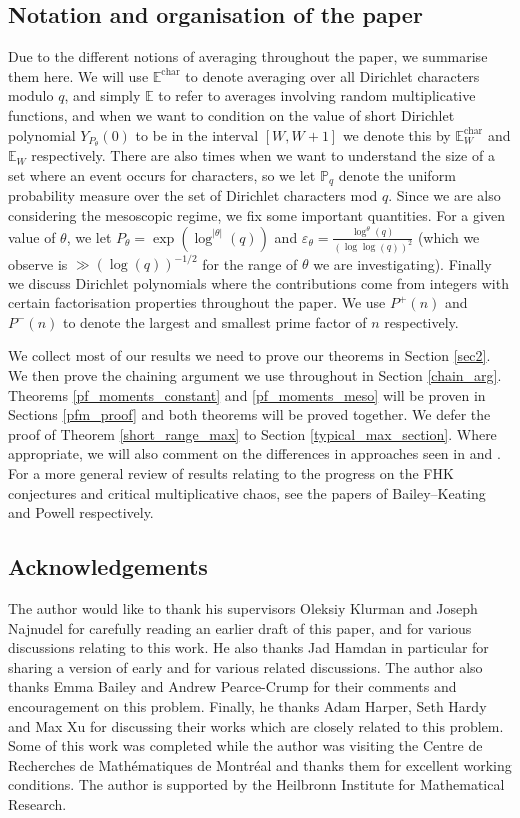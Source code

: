 \documentclass[reqno]{amsart}
\theoremstyle{definition}
\theoremstyle{remark}
\numberwithin{equation}{section}
\theoremstyle{remark}
\begin{document}
\subsection{Notation and organisation of the paper}
Due to the different notions of averaging throughout the paper, we summarise them here. We will use $\mathbb{E}^{\text{char}}$ to denote averaging over all Dirichlet characters modulo $q$, and simply $\mathbb{E}$ to refer to averages involving random multiplicative functions, and when we want to condition on the value of short Dirichlet polynomial $Y_{P_\theta}(0)$ to be in the interval $[W,W+1]$ we denote this by $\mathbb{E}_{W}^{\text{char}}$ and $\mathbb{E}_W$ respectively. There are also times when we want to understand the size of a set where an event occurs for characters, so we let $\mathbb{P}_q$ denote the uniform probability measure over the set of Dirichlet characters mod $q$. Since we are also considering the mesoscopic regime, we fix some important quantities. For a given value of $\theta$, we let $P_\theta = \exp(\log^{|\theta|}(q))$ and $\varepsilon_\theta = \frac{\log^\theta(q)}{(\log\log(q))^2}$ (which we observe is $\gg (\log(q))^{-1/2}$ for the range of $\theta$ we are investigating). Finally we discuss Dirichlet polynomials where the contributions come from integers with certain factorisation properties throughout the paper. We use $P^+(n)$ and $P^{-}(n)$ to denote the largest and smallest prime factor of $n$ respectively.\par
We collect most of our results we need to prove our theorems in Section \ref{sec2}. We then prove the chaining argument we use throughout in Section \ref{chain_arg}. Theorems \ref{pf_moments_constant} and \ref{pf_moments_meso} will be proven in Sections \ref{pfm_proof} and both theorems will be proved together. We defer the proof of Theorem \ref{short_range_max} to Section \ref{typical_max_section}. Where appropriate, we will also comment on the differences in approaches seen in \cite{harper2019partition} and \cite{abr20}. For a more general review of results relating to the progress on the FHK conjectures and critical multiplicative chaos, see the papers of Bailey--Keating \cite{bk22} and Powell \cite{powell22} respectively.
\subsection*{Acknowledgements}
The author would like to thank his supervisors Oleksiy Klurman and Joseph Najnudel for carefully reading an earlier draft of this paper, and for various discussions relating to this work. He also thanks Jad Hamdan in particular for sharing a version of \cite{ah24} early and for various related discussions. The author also thanks Emma Bailey and Andrew Pearce-Crump for their comments and encouragement on this problem. Finally, he thanks Adam Harper, Seth Hardy and Max Xu for discussing their works which are closely related to this problem. Some of this work was completed while the author was visiting the Centre de Recherches de Math\'{e}matiques de Montr\'{e}al and thanks them for excellent working conditions. The author is supported by the Heilbronn Institute for Mathematical Research.
\end{document}
